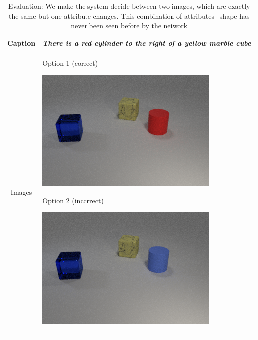 \begin{table}\centering
\begin{tabularx}{\linewidth}{c X}
  \toprule
  Caption & \hfill \textit{There is a red cylinder to the right of a yellow marble cube} \hfill\null \\
  \midrule
  Images & 
    \hfill \makecell{Option 1 (correct) \\ 
        \begin{minipage}{.3\textwidth}
          \includegraphics[width=\linewidth]{figures/clevr_datasets/SCLEVR3_original.png}
        \end{minipage} \\} 
    \hfill \makecell{Option 2 (incorrect) \\ 
        \begin{minipage}{.3\textwidth}
          \includegraphics[width=\linewidth]{figures/clevr_datasets/SCLEVR3_negcolor.png}
        \end{minipage}} \\
  \bottomrule
\end{tabularx}
 \caption{Evaluation:  We  make  the  system  decide  between  two  images, which  are  exactly  the  same but  one  attribute  changes.  This  combination  of attributes+shape  has  never  been  seen  before  by  the  network }
\end{table}

